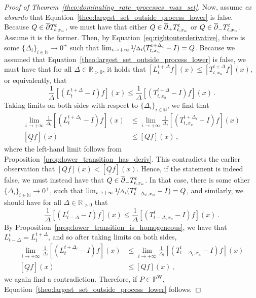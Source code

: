 \documentclass[10pt,a4paper]{paper}
\theoremstyle{definition}
\newcommand{\nats}{\mathbb{N}}
\newcommand{\reals}{\mathbb{R}}
\newcommand{\realspos}{\reals_{>0}}
\newcommand{\processes}{\mathbb{P}}
\newcommand{\wprocesses}{\processes^{\mathrm{W}}}
\newcommand{\lrate}{\underline{Q}}
\begin{document}
\begin{proof}[Proof of Theorem~\ref{theo:dominating_rate_processes_max_set}]
Now, assume \emph{ex absurdo} that Equation~\eqref{theo:largest_set_outside_process_lower} is false. Because $Q\in\smash{\overline{\partial}}T_{t,x_u}^{t}$, we must have that either $Q\in\smash{\overline{\partial}}_+T_{t,x_u}^{t}$ or $Q\in\smash{\overline{\partial}}_-T_{t,x_u}^{t}$. Assume it is the former. Then, by Equation~\ref{eq:rightouterderivative}, there is some $\{\Delta_i\}_{i\in\nats}\to0^+$ such that $\lim_{i\to+\infty}\nicefrac{1}{\Delta_i}(T_{t,x_u}^{t+\Delta_i}-I)=Q$. Because we assumed that Equation~\eqref{theo:largest_set_outside_process_lower} is false, we must have that for all $\Delta\in\realspos$, it holds that $\left[L_t^{t+\Delta}f\right](x) \leq \left[T_{t,x_u}^{t+\Delta}f\right](x)$,
or equivalently, that
\begin{equation*}
\frac{1}{\Delta}\left[(L_t^{t+\Delta} - I)f\right](x) \leq \frac{1}{\Delta}\left[(T_{t,x_u}^{t+\Delta} - I)f\right](x)\,.
\end{equation*}
Taking limits on both sides with respect to $\{\Delta_i\}_{i\in\nats}$, we find that
\begin{align*}
\lim_{i\to+\infty}\frac{1}{\Delta_i}\left[(L_t^{t+\Delta_i} - I)f\right](x) &\leq \lim_{i\to+\infty}\frac{1}{\Delta_i}\left[(T_{t,x_u}^{t+\Delta_i} - I)f\right](x) \\
\left[\lrate f\right](x) &\leq \left[Qf\right](x)\,,
\end{align*}
where the left-hand limit follows from Proposition~\ref{prop:lower_transition_has_deriv}. This contradicts the earlier observation that $\left[Qf\right](x)<\left[\lrate f\right](x)$. Hence, if the statement is indeed false, we must instead have that $Q\in\smash{\overline{\partial}}_-T_{t,x_u}^{t}$. In that case, there is some other $\{\Delta_i\}_{i\in\nats}\to0^+$, such that $\lim_{i\to+\infty}\nicefrac{1}{\Delta_i}(T_{t-\Delta_i,x_u}^{t}-I)=Q$, and similarly, we should have for all $\Delta\in\realspos$ that
\begin{equation*}
\frac{1}{\Delta}\left[(L_{t-\Delta}^{t} - I)f\right](x) \leq \frac{1}{\Delta}\left[(T_{t-\Delta,x_u}^{t} - I)f\right](x)\,.
\end{equation*}
By Proposition~\ref{prop:lower_transition_is_homogeneous}, we have that $L_{t-\Delta}^{t}=L_{t}^{t+\Delta}$, and so after taking limits on both sides,
\begin{align*}
\lim_{i\to+\infty}\frac{1}{\Delta_i}\left[(L_t^{t+\Delta_i} - I)f\right](x) &\leq \lim_{i\to+\infty}\frac{1}{\Delta_i}\left[(T_{t-\Delta_i,x_u}^{t} - I)f\right](x) \\
\left[\lrate f\right](x) &\leq \left[Qf\right](x)\,,
\end{align*}
we again find a contradiction. Therefore, if $P\in\wprocesses$, Equation~\eqref{theo:largest_set_outside_process_lower} follows.


\end{proof}
\end{document}
